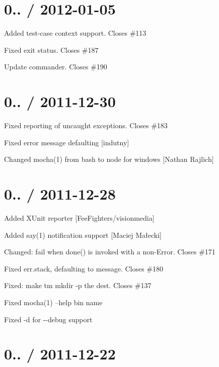 \section*{0.. / 2012-\/01-\/05}


\begin{DoxyItemize}
\item Added test-\/case context support. Closes \#113
\item Fixed exit status. Closes \#187
\item Update commander. Closes \#190
\end{DoxyItemize}

\section*{0.. / 2011-\/12-\/30}


\begin{DoxyItemize}
\item Fixed reporting of uncaught exceptions. Closes \#183
\item Fixed error message defaulting \mbox{[}indutny\mbox{]}
\item Changed mocha(1) from bash to node for windows \mbox{[}Nathan Rajlich\mbox{]}
\end{DoxyItemize}

\section*{0.. / 2011-\/12-\/28}


\begin{DoxyItemize}
\item Added {\ttfamily X\+Unit} reporter \mbox{[}Fee\+Fighters/visionmedia\mbox{]}
\item Added {\ttfamily say(1)} notification support \mbox{[}Maciej Małecki\mbox{]}
\item Changed\+: fail when done() is invoked with a non-\/\+Error. Closes \#171
\item Fixed {\ttfamily err.\+stack}, defaulting to message. Closes \#180
\item Fixed\+: {\ttfamily make tm} mkdir -\/p the dest. Closes \#137
\item Fixed mocha(1) --help bin name
\item Fixed {\ttfamily -\/d} for {\ttfamily -\/-\/debug} support
\end{DoxyItemize}

\section*{0.. / 2011-\/12-\/22}



